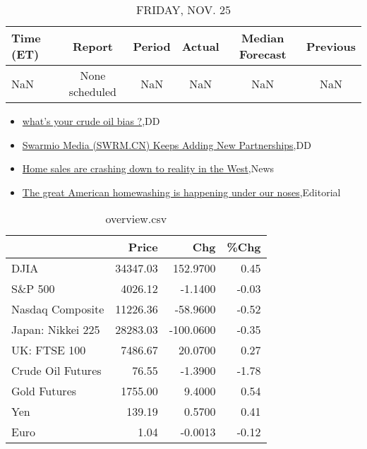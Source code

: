\documentclass{article}%
\begin{document}
%


\begin{table}[htbp]%
\caption{FRIDAY, NOV. 25}%
\centering%
\begin{adjustbox}{width=1\textwidth}%
\begin{tabular}{lccccc}
\toprule
Time (ET) &         Report & Period & Actual & Median Forecast & Previous \\
\midrule
      NaN & None scheduled &    NaN &    NaN &             NaN &      NaN \\
\bottomrule
\end{tabular}
%
\end{adjustbox}%
\end{table}

%
\begin{itemize}%
\item%
\href{https://reddit.com/r/wallstreetbets/comments/z55yk8/whats\_your\_crude\_oil\_bias/}{what's your crude oil bias ?},DD%
\item%
\href{https://reddit.com/r/Baystreetbets/comments/z4k1hg/swarmio\_media\_swrmcn\_keeps\_adding\_new\_partnerships/}{Swarmio Media (SWRM.CN) Keeps Adding New Partnerships},DD%
\item%
\href{https://reddit.com/r/Economics/comments/z4xdt5/home\_sales\_are\_crashing\_down\_to\_reality\_in\_the/}{Home sales are crashing down to reality in the West},News%
\item%
\href{https://reddit.com/r/Economics/comments/z4vngk/the\_great\_american\_homewashing\_is\_happening\_under/}{The great American homewashing is happening under our noses},Editorial%
\end{itemize}%


\begin{table}[htbp]%
\caption{overview.csv}%
\centering%
\begin{adjustbox}{width=1\textwidth}%
\begin{tabular}{lrrr}
\toprule
                  &    Price &       Chg &  \%Chg \\
\midrule
             DJIA & 34347.03 &  152.9700 &  0.45 \\
          S\&P 500 &  4026.12 &   -1.1400 & -0.03 \\
 Nasdaq Composite & 11226.36 &  -58.9600 & -0.52 \\
Japan: Nikkei 225 & 28283.03 & -100.0600 & -0.35 \\
     UK: FTSE 100 &  7486.67 &   20.0700 &  0.27 \\
Crude Oil Futures &    76.55 &   -1.3900 & -1.78 \\
     Gold Futures &  1755.00 &    9.4000 &  0.54 \\
              Yen &   139.19 &    0.5700 &  0.41 \\
             Euro &     1.04 &   -0.0013 & -0.12 \\
\bottomrule
\end{tabular}
%
\end{adjustbox}%
\end{table}
\end{document}
